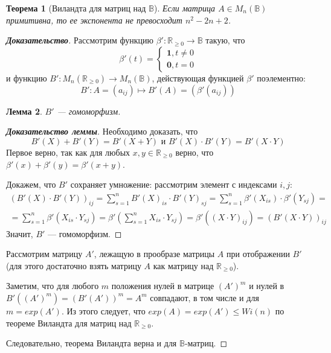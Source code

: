 \documentclass[12pt]{article}
\newtheorem{theorem}{Теорема}[section]
\newtheorem{lemma}[theorem]{Лемма}
\begin{document}
\begin{theorem}[Виландта для матриц над $\mathbb{B}$]
Если матрица $A \in M_n(\mathbb{B})$ примитивна, то ее экспонента не превосходит $n^2-2n+2$.
\end{theorem}
\begin{proof}[\textbf{Доказательство}]
Рассмотрим функцию $\beta' : \mathbb{R}_{\geq0} \rightarrow \mathbb{B}$ такую, что
\begin{equation}
    \beta'(t) = 
    \begin{cases}
        \textbf{1}, t \neq 0 \\
        \textbf{0}, t = 0
    \end{cases}
\end{equation}
и функцию $B' : M_n(\mathbb{R}_{\geq0}) \rightarrow M_n(\mathbb{B})$, действующая функцией $\beta'$ поэлементно:
\begin{equation}
    B' : A=(a_{ij}) \mapsto B'(A)=(\beta'(a_{ij}))
\end{equation}
\begin{lemma} \label{l:B'}
$B'$ --- гомоморфизм.
\end{lemma}
\begin{proof}[\textbf{Доказательство леммы}]
Необходимо доказать, что
\begin{equation}
    B'(X)+B'(Y)=B'(X + Y) \text{ и } B'(X) \cdot B'(Y) = B'(X\cdot Y)
\end{equation}
Первое верно, так как для любых $x, y \in \mathbb{R}_{\geq0}$ верно, что $\beta'(x) + \beta'(y) = \beta'(x + y)$.

Докажем, что $B'$ сохраняет умножение: рассмотрим элемент с индексами $i, j$: 
\begin{multline}
    (B'(X) \cdot B'(Y))_{ij} = \sum_{s=1}^{n} B'(X)_{is}\cdot B'(Y)_{sj}
    =\sum_{s=1}^{n} \beta'(X_{is})\cdot \beta'(Y_{sj})= \\
    =\sum_{s=1}^{n} \beta'(X_{is}\cdot Y_{sj})=
    \beta'(\sum_{s=1}^{n} X_{is}\cdot Y_{sj})=
    \beta'((X\cdot Y)_{ij})=
    (B'(X\cdot Y))_{ij}
\end{multline} 
Значит, $B'$ --- гомоморфизм.
\end{proof}

Рассмотрим матрицу $A'$, лежащую в прообразе матрицы $A$ при отображении $B'$ (для этого достаточно взять матрицу $A$ как матрицу над $\mathbb{R}_{\ge 0}$).

Заметим, что для любого $m$ положения нулей в матрице $(A')^m$ и нулей в $B'((A')^m) = (B'(A'))^m = A^m$ совпадают, в том числе и для $m = exp(A')$. Из этого следует, что $exp(A) = exp(A') \le Wi(n)$ по теореме Виландта для матриц над $\mathbb{R}_{\ge 0}$.

Следовательно, теорема Виландта верна и для $\mathbb{B}$-матриц.
\end{proof}
\end{document}
